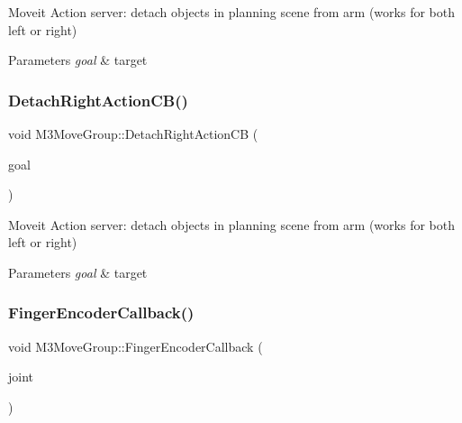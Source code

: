 Moveit Action server\+: detach objects in planning scene from arm (works for both left or right) 


\begin{DoxyParams}{Parameters}
{\em goal} & target \\
\hline
\end{DoxyParams}
\mbox{\label{classM3MoveGroup_a0e43c201d45fd9d987dd5b57f57e6402}} 
\subsubsection{\texorpdfstring{Detach\+Right\+Action\+C\+B()}{DetachRightActionCB()}\hspace{0.1cm}{\footnotesize\ttfamily [2/2]}}
{\footnotesize\ttfamily void M3\+Move\+Group\+::\+Detach\+Right\+Action\+CB (\begin{DoxyParamCaption}\item[{const m3\+\_\+moveit\+::\+Moveit\+Pick\+Place\+Goal\+Const\+Ptr \&}]{goal }\end{DoxyParamCaption})\hspace{0.3cm}{\ttfamily [inline]}}



Moveit Action server\+: detach objects in planning scene from arm (works for both left or right) 


\begin{DoxyParams}{Parameters}
{\em goal} & target \\
\hline
\end{DoxyParams}
\mbox{\label{classM3MoveGroup_a7208ba7725391ea9ffd98d3d31ae5f0d}} 
\subsubsection{\texorpdfstring{Finger\+Encoder\+Callback()}{FingerEncoderCallback()}\hspace{0.1cm}{\footnotesize\ttfamily [1/2]}}
{\footnotesize\ttfamily void M3\+Move\+Group\+::\+Finger\+Encoder\+Callback (\begin{DoxyParamCaption}\item[{const kaist\+\_\+msgs\+::\+Joint\+Encoder\+Status\+Const\+Ptr \&}]{joint }\end{DoxyParamCaption})\hspace{0.3cm}{\ttfamily [inline]}}



